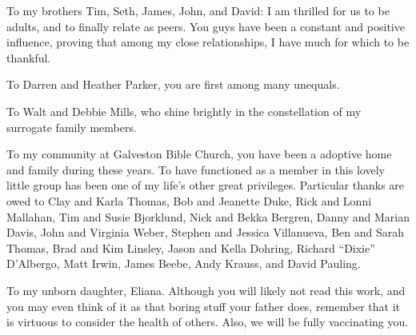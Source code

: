 \documentclass[11pt]{report}	%
\theoremstyle{definition}
\theoremstyle{remark}
\begin{document}
\begin{acknowledgments}
To my brothers Tim, Seth, James, John, and David: I am thrilled for us to be adults,
and to finally relate as peers. You guys have been a constant and positive influence,
proving that among my close relationships, I have much for which to be thankful.

To Darren and Heather Parker, you are first among many unequals.

To Walt and Debbie Mills, who shine brightly in the constellation of my surrogate family members.

To my community at Galveston Bible Church, you have been a adoptive home and family during these years. To have functioned as a member in this lovely little group has been one of my life's other great privileges. Particular thanks are owed to Clay and Karla Thomas, Bob and Jeanette Duke, Rick and Lonni Mallahan, Tim and Susie Bjorklund, Nick and Bekka Bergren, Danny and Marian Davis, John and Virginia Weber, Stephen and Jessica Villanueva, Ben and Sarah Thomas, Brad and Kim Linsley, Jason and Kella Dohring, Richard ``Dixie'' D'Albergo, Matt Irwin, James Beebe, Andy Krauss, and David Pauling.

To my unborn daughter, Eliana. Although you will likely not read this work, and you may even think of it as 
that boring stuff your father does, remember that it is virtuous to consider the health of others. Also, we will be fully vaccinating you.
\end{acknowledgments}
\end{document}
